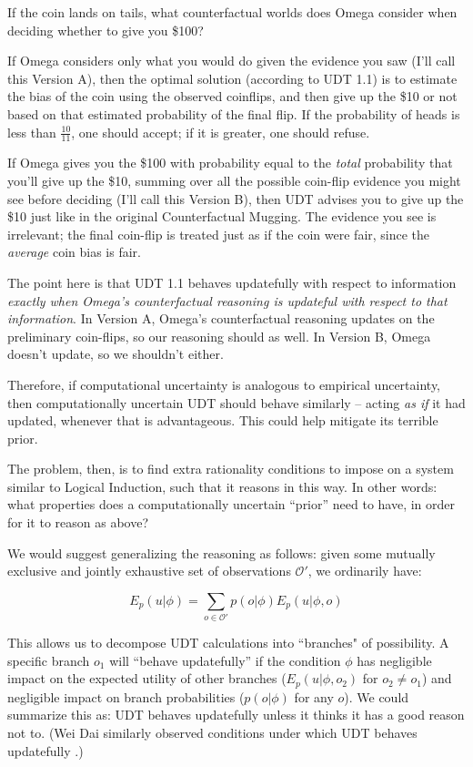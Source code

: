 \documentclass{article}
\begin{document}
If the coin lands on tails, what counterfactual worlds does Omega consider when deciding whether to give you \$100?

If Omega considers only what you would do given the evidence you saw (I'll call this Version A), then the optimal solution (according to UDT 1.1) is to estimate the bias of the coin using the observed coinflips, and then give up the \$10 or not based on that estimated probability of the final flip. If the probability of heads is less than $\frac{10}{11}$, one should accept; if it is greater, one should refuse.

If Omega gives you the \$100 with probability equal to the \emph{total} probability that you'll give up the \$10, summing over all the possible coin-flip evidence you might see before deciding (I'll call this Version B), then UDT advises you to give up the \$10 just like in the original Counterfactual Mugging. The evidence you see is irrelevant; the final coin-flip is treated just as if the coin were fair, since the \emph{average} coin bias is fair.

The point here is that UDT 1.1 behaves updatefully with respect to information \emph{exactly when Omega's counterfactual reasoning is updateful with respect to that information}. In Version A, Omega's counterfactual reasoning updates on the preliminary coin-flips, so our reasoning should as well. In Version B, Omega doesn't update, so we shouldn't either.

Therefore, if computational uncertainty is analogous to empirical uncertainty, then computationally uncertain UDT should behave similarly -- acting \emph{as if} it had updated, whenever that is advantageous. This could help mitigate its terrible prior.

The problem, then, is to find extra rationality conditions to impose on a system similar to Logical Induction, such that it reasons in this way. In other words: what properties does a computationally uncertain ``prior'' need to have, in order for it to reason as above?

We would suggest generalizing the reasoning as follows: given some mutually exclusive and jointly exhaustive set of observations $\mathcal{O}'$, we ordinarily have:

$$E_p(u|\phi) = \sum_{o\in\mathcal{O}'} p(o|\phi)E_p(u|\phi, o)$$

This allows us to decompose UDT calculations into ``branches" of possibility. A specific branch $o_1$ will ``behave updatefully'' if the condition $\phi$ has negligible impact on the expected utility of other branches ($E_p(u|\phi, o_2)$ for $o_2 \neq o_1$) and negligible impact on branch probabilities ($p(o|\phi)$ for any $o$). We could summarize this as: UDT behaves updatefully unless it thinks it has a good reason not to. (Wei Dai similarly observed conditions under which UDT behaves updatefully \cite{dai2009bayesian}.)
\end{document}

